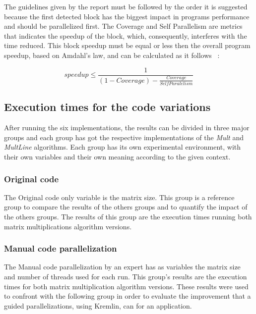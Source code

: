 The guidelines given by the report must be followed by the order it is suggested because the first detected block has the biggest impact in programs performance and should be parallelized first. The Coverage and Self Parallelism are metrics that indicates the speedup of the block, which, consequently, interferes with the time reduced. This block speedup must be equal or less then the overall program speedup, based on Amdahl's law, and can be calculated as it follows ~\cite{Saturnino}:

\begin{equation}
speedup \leq \frac{1}{(1- Coverage) - \frac{Coverage}{Self Paralelism}}
\end{equation}

\subsection{Execution times for the code variations}

After running the six implementations, the results can be divided in three major groups and each group has got the respective implementations of the \textit{Mult} and \textit{MultLine} algorithms. Each group has its own experimental environment,  with their own variables and their own meaning according to the given context.

\subsubsection{Original code}

The Original code only variable is the matrix size. This group is  a reference group to compare the results of the others groups and to quantify the impact of the others groups. The results of this group are the execution times running both matrix multiplications algorithm versions.

\subsubsection{Manual code parallelization}

The Manual code parallelization by an expert has as variables the matrix size and number of threads used for each run. This group's results are the execution times for both matrix multiplication algorithm versions. These results were used to confront with the following group in order to evaluate the improvement that a guided parallelizations, using Kremlin, can for an application.

